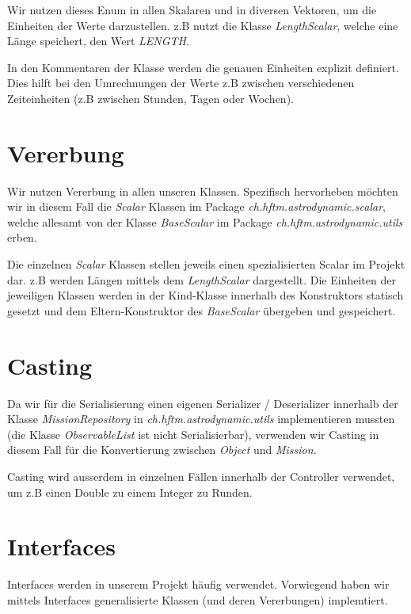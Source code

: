 Wir nutzen dieses Enum in allen Skalaren und in diversen Vektoren, um die Einheiten der Werte darzustellen. z.B nutzt die Klasse \textit{LengthScalar}, welche eine Länge speichert, den Wert \textit{LENGTH}.

In den Kommentaren der Klasse werden die genauen Einheiten explizit definiert. Dies hilft bei den Umrechnungen der Werte z.B zwischen verschiedenen Zeiteinheiten (z.B zwischen Stunden, Tagen oder Wochen).

\section{Vererbung}

Wir nutzen Vererbung in allen unseren Klassen. Spezifisch hervorheben möchten wir in diesem Fall die \textit{Scalar} Klassen im Package \textit{ch.hftm.astrodynamic.scalar}, welche allesamt von der Klasse \textit{BaseScalar} im Package \textit{ch.hftm.astrodynamic.utils} erben.

Die einzelnen \textit{Scalar} Klassen stellen jeweils einen spezialisierten Scalar im Projekt dar. z.B werden Längen mittels dem \textit{LengthScalar} dargestellt.
Die Einheiten der jeweiligen Klassen werden in der Kind-Klasse innerhalb des Konstruktors statisch gesetzt und dem Eltern-Konstruktor des \textit{BaseScalar} übergeben und gespeichert.

\section{Casting}

Da wir für die Serialisierung einen eigenen Serializer / Deserializer innerhalb der Klasse \textit{MissionRepository} in \textit{ch.hftm.astrodynamic.utils} implementieren mussten (die Klasse \textit{ObservableList} ist nicht Serialisierbar), verwenden wir Casting in diesem Fall für die Konvertierung zwischen \textit{Object} und \textit{Mission}.

Casting wird ausserdem in einzelnen Fällen innerhalb der Controller verwendet, um z.B einen Double zu einem Integer zu Runden.

\section{Interfaces}

Interfaces werden in unserem Projekt häufig verwendet. Vorwiegend haben wir mittels Interfaces generalisierte Klassen (und deren Vererbungen) implemtiert.

